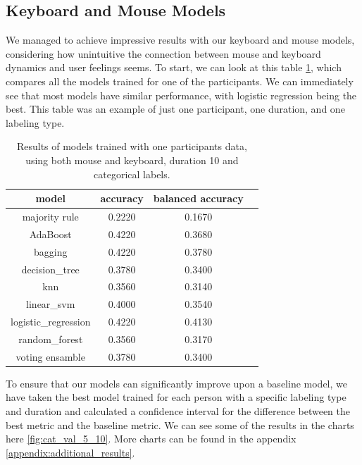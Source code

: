 
    \subsection{Keyboard and Mouse Models}

    We managed to achieve impressive results with our keyboard and mouse models, considering how unintuitive the connection between
    mouse and keyboard dynamics and user feelings seems. To start, we can look at this table \ref{table:shoham_models}, 
    which compares all the models trained for one of the participants. We can immediately see that most models have similar performance, 
    with logistic regression being the best. This table was an example of just one participant, one duration, and one labeling type. 

    \begin{table}[htp]
        \centering
        \begin{center}
            \begin{tabular}{cccc}
                \toprule
                model &  accuracy & balanced accuracy & \\
                \midrule
                    majority rule           & 0.2220 & 0.1670 & \\
                    AdaBoost                & 0.4220 & 0.3680 & \\
                    bagging                 & 0.4220 & 0.3780 & \\
                    decision\_tree          & 0.3780 & 0.3400 & \\
                    knn                     & 0.3560 & 0.3140 & \\
                    linear\_svm             & 0.4000 & 0.3540 & \\
                    logistic\_regression    & 0.4220 & 0.4130 & \\
                    random\_forest          & 0.3560 & 0.3170 & \\
                    voting ensamble         & 0.3780 & 0.3400 & \\
                \bottomrule
            \end{tabular}
        \end{center}
        \caption{Results of models trained with one participants data, using both mouse and keyboard, duration 10 and categorical labels.}
        \label{table:shoham_models}
    \end{table}


    To ensure that our models can significantly improve upon a baseline model, 
    we have taken the best model trained for each person with a specific labeling type and duration and calculated a confidence interval 
    for the difference between the best metric and the baseline metric. We can see some of the results in the charts here \ref{fig:cat_val_5_10}. 
    More charts can be found in the appendix \ref{appendix:additional_results}.

